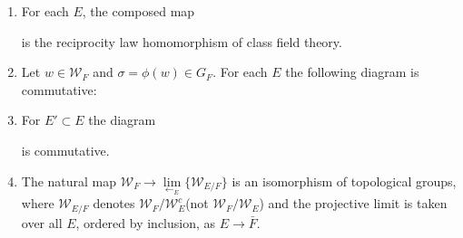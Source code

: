 \documentclass{article}
\theoremstyle{theorem}
\begin{document}
\begin{enumerate}
    \item For each $E$, the composed map

    is the reciprocity law homomorphism of class field theory.
    \item Let $w\in \mathcal{W}_{F}$ and $\sigma=\phi(w)\in G_{F}$. For each $E$ the following diagram is commutative:
 
 

\item For $E'\subset E$ the diagram



is commutative.

\item The natural map $\mathcal{W}_{F}\rightarrow \lim\limits_{\leftarrow_{E}}\{\mathcal{W}_{E/F}\}$ is an isomorphism of topological groups, where $\mathcal{W}_{E/F}$ denotes $\mathcal{W}_{F}/\mathcal{W}^{c}_{E}$(not $\mathcal{W}_{F}/\mathcal{W}_{E}$) and the projective limit is taken over all $E$, ordered by inclusion, as $E\rightarrow\bar{F}$. 

\end{enumerate}
\end{document}
